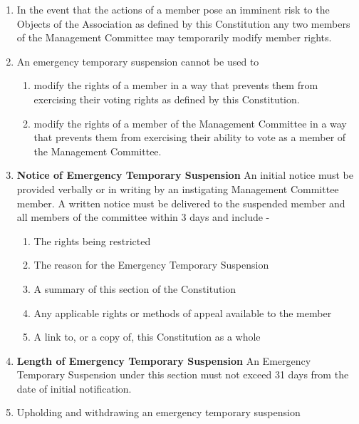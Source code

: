 \documentclass[../constitution.tex]{subfiles}
\begin{document}

\begin{enumerate}

\item In the event that the actions of a member pose an imminent risk to the Objects of the Association as defined by this Constitution any two members of the Management Committee may temporarily modify member rights.
\item An emergency temporary suspension cannot be used to

  \begin{enumerate}
  
  \item modify the rights of a member in a way that prevents them from exercising their voting rights as defined by this Constitution.
  \item modify the rights of a member of the Management Committee in a way that prevents them from exercising their ability to vote as a member of the Management Committee.
  \end{enumerate}
\item \textbf{Notice of Emergency Temporary Suspension} An initial notice must be provided verbally or in writing by an instigating Management Committee member. A written notice must be delivered to the suspended member and all members of the committee within 3 days and include -

  \begin{enumerate}
  
  \item The rights being restricted\\
  \item The reason for the Emergency Temporary Suspension\\
  \item A summary of this section of the Constitution\\
  \item Any applicable rights or methods of appeal available to the member
  \item A link to, or a copy of, this Constitution as a whole\\
  \end{enumerate}
\item \textbf{Length of Emergency Temporary Suspension} An Emergency Temporary Suspension under this section must not exceed 31 days from the date of initial notification.\\
\item Upholding and withdrawing an emergency temporary suspension


\end{enumerate}
\end{document}
